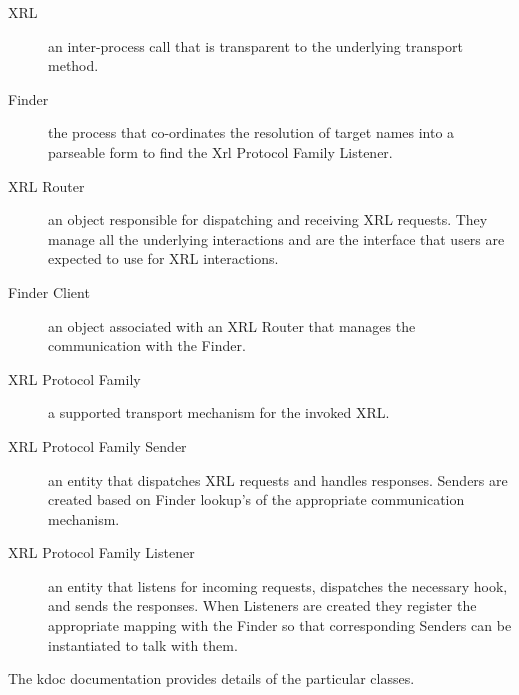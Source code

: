 \documentclass[11pt]{article}
\begin{document}
\begin{description}
\item [XRL] an inter-process call that is transparent to the
underlying transport method.

\item [Finder] the process that co-ordinates the resolution of target
names into a parseable form to find the Xrl Protocol Family Listener.

\item [XRL Router] an object responsible for dispatching and receiving
XRL requests.  They manage all the underlying interactions and are the
interface that users are expected to use for XRL interactions.

\item [Finder Client] an object associated with an XRL Router that
manages the communication with the Finder.

\item [XRL Protocol Family] a supported transport mechanism for the
invoked XRL.

\item [XRL Protocol Family Sender] an entity that dispatches XRL
requests and handles responses.  Senders are created based on Finder
lookup's of the appropriate communication mechanism.

\item [XRL Protocol Family Listener] an entity that listens for
incoming requests, dispatches the necessary hook, and sends the
responses.  When Listeners are created they register the appropriate
mapping with the Finder so that corresponding Senders can be
instantiated to talk with them.

\end{description}

The kdoc documentation provides details of the particular classes.



\end{document}
